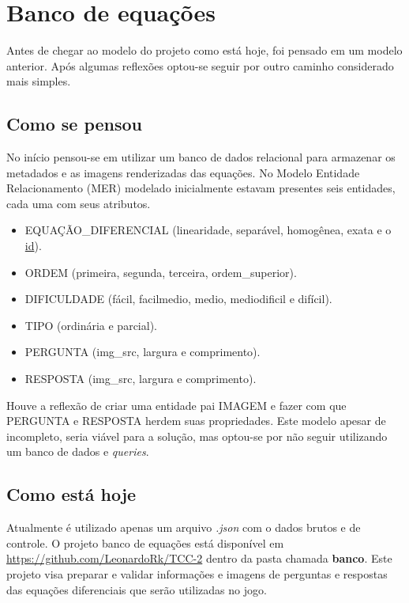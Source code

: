 \section[Banco de equações]{Banco de equações}
Antes de chegar ao modelo do projeto como está hoje, foi pensado em um modelo anterior. Após algumas reflexões
optou-se seguir por outro caminho considerado mais simples.

\subsection[Como se pensou]{Como se pensou}

No início pensou-se em utilizar um banco de dados relacional para armazenar os metadados e as imagens renderizadas das equações. No Modelo Entidade Relacionamento (MER) modelado inicialmente estavam presentes seis entidades, cada uma com seus atributos. 

\begin{itemize}
	\item EQUAÇÃO\_DIFERENCIAL (linearidade, separável, homogênea, exata e o \underline{id}).
	\item ORDEM (primeira, segunda, terceira, ordem\_superior).
	\item DIFICULDADE (fácil, facilmedio, medio, mediodificil e difícil).
	\item TIPO (ordinária e parcial).
	\item PERGUNTA (img\_src, largura e comprimento).
	\item RESPOSTA (img\_src, largura e comprimento).
\end{itemize}

Houve a reflexão de criar uma entidade pai IMAGEM e fazer com que PERGUNTA e RESPOSTA herdem suas propriedades. Este modelo apesar de incompleto, seria viável para a solução, mas optou-se por não seguir utilizando um banco de dados e \textit{queries}.

\subsection[Como está hoje]{Como está hoje}

Atualmente é utilizado apenas um arquivo \textit{.json} com o dados brutos e de controle.
O projeto banco de equações está disponível em \url{https://github.com/LeonardoRk/TCC-2} dentro da pasta chamada \textbf{banco}. Este projeto visa preparar e validar informações e imagens de perguntas e respostas das equações diferenciais que serão utilizadas no jogo.

